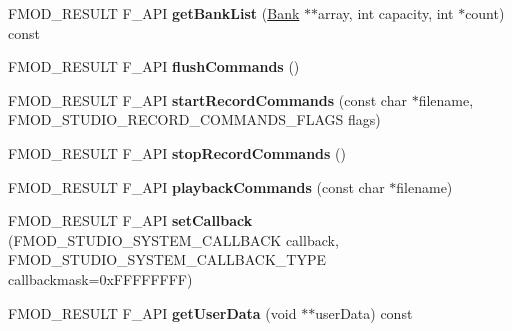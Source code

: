 \begin{DoxyCompactItemize}
\item 
\hypertarget{class_f_m_o_d_1_1_studio_1_1_system_a4f5904ba685b59ac1b8e73f73009467e}{F\+M\+O\+D\+\_\+\+R\+E\+S\+U\+L\+T F\+\_\+\+A\+P\+I {\bfseries get\+Bank\+List} (\hyperlink{class_f_m_o_d_1_1_studio_1_1_bank}{Bank} $\ast$$\ast$array, int capacity, int $\ast$count) const }\label{class_f_m_o_d_1_1_studio_1_1_system_a4f5904ba685b59ac1b8e73f73009467e}

\item 
\hypertarget{class_f_m_o_d_1_1_studio_1_1_system_abf1fb5ba97f62cbf857887eb5a2d580b}{F\+M\+O\+D\+\_\+\+R\+E\+S\+U\+L\+T F\+\_\+\+A\+P\+I {\bfseries flush\+Commands} ()}\label{class_f_m_o_d_1_1_studio_1_1_system_abf1fb5ba97f62cbf857887eb5a2d580b}

\item 
\hypertarget{class_f_m_o_d_1_1_studio_1_1_system_a314de1f6d7de380d38a0c289be42c4f0}{F\+M\+O\+D\+\_\+\+R\+E\+S\+U\+L\+T F\+\_\+\+A\+P\+I {\bfseries start\+Record\+Commands} (const char $\ast$filename, F\+M\+O\+D\+\_\+\+S\+T\+U\+D\+I\+O\+\_\+\+R\+E\+C\+O\+R\+D\+\_\+\+C\+O\+M\+M\+A\+N\+D\+S\+\_\+\+F\+L\+A\+G\+S flags)}\label{class_f_m_o_d_1_1_studio_1_1_system_a314de1f6d7de380d38a0c289be42c4f0}

\item 
\hypertarget{class_f_m_o_d_1_1_studio_1_1_system_aa2ed17c5ac75b9f72cf12adcee4d2f93}{F\+M\+O\+D\+\_\+\+R\+E\+S\+U\+L\+T F\+\_\+\+A\+P\+I {\bfseries stop\+Record\+Commands} ()}\label{class_f_m_o_d_1_1_studio_1_1_system_aa2ed17c5ac75b9f72cf12adcee4d2f93}

\item 
\hypertarget{class_f_m_o_d_1_1_studio_1_1_system_a3b85e5247e581518de2b0142af2e851d}{F\+M\+O\+D\+\_\+\+R\+E\+S\+U\+L\+T F\+\_\+\+A\+P\+I {\bfseries playback\+Commands} (const char $\ast$filename)}\label{class_f_m_o_d_1_1_studio_1_1_system_a3b85e5247e581518de2b0142af2e851d}

\item 
\hypertarget{class_f_m_o_d_1_1_studio_1_1_system_ae9c9b6702682c98e0634fd650146009d}{F\+M\+O\+D\+\_\+\+R\+E\+S\+U\+L\+T F\+\_\+\+A\+P\+I {\bfseries set\+Callback} (F\+M\+O\+D\+\_\+\+S\+T\+U\+D\+I\+O\+\_\+\+S\+Y\+S\+T\+E\+M\+\_\+\+C\+A\+L\+L\+B\+A\+C\+K callback, F\+M\+O\+D\+\_\+\+S\+T\+U\+D\+I\+O\+\_\+\+S\+Y\+S\+T\+E\+M\+\_\+\+C\+A\+L\+L\+B\+A\+C\+K\+\_\+\+T\+Y\+P\+E callbackmask=0x\+F\+F\+F\+F\+F\+F\+F\+F)}\label{class_f_m_o_d_1_1_studio_1_1_system_ae9c9b6702682c98e0634fd650146009d}

\item 
\hypertarget{class_f_m_o_d_1_1_studio_1_1_system_aafd4a9efb1925ea7e813ae19b062cf63}{F\+M\+O\+D\+\_\+\+R\+E\+S\+U\+L\+T F\+\_\+\+A\+P\+I {\bfseries get\+User\+Data} (void $\ast$$\ast$user\+Data) const }\label{class_f_m_o_d_1_1_studio_1_1_system_aafd4a9efb1925ea7e813ae19b062cf63}


\end{DoxyCompactItemize}
